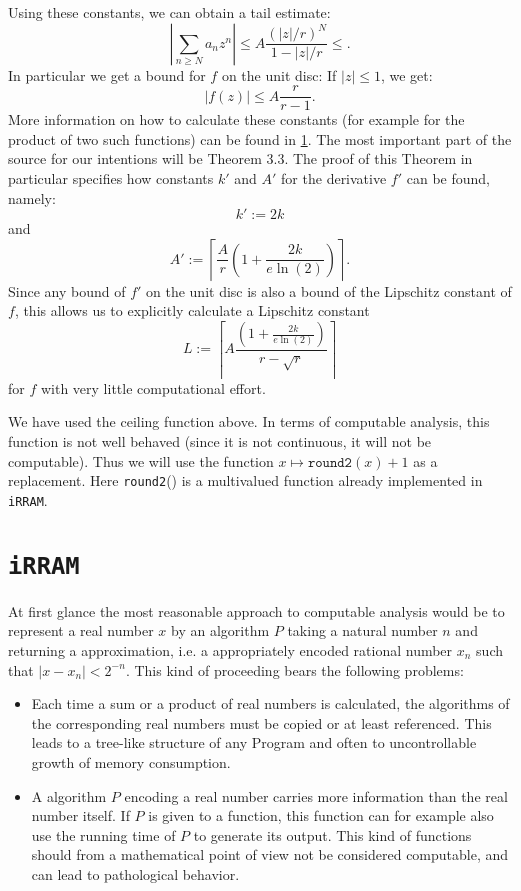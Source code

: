 \documentclass{article}
\newcommand{\irram}{\texttt{iRRAM}\xspace}
\newcommand{\ir}[1]{\texttt{#1}\xspace}
\begin{document}
Using these constants, we can obtain a tail estimate:
\[ \left|\sum_{n \geq N} a_n z^n\right| \leq A \frac{(|z|/r)^N}{1- |z|/r} \leq. \]
In particular we get a bound for $f$ on the unit disc: If $|z|\leq 1$, we get:
\[ |f(z)| \leq A\frac r{r-1}. \]
More information on how to calculate these constants (for example for the product of two such functions) can be found in \ref{}. The most important part of the source for our intentions will be Theorem 3.3. The proof of this Theorem in particular specifies how constants $k'$ and $A'$ for the derivative $f'$ can be found, namely:
\[ k' := 2 k \]
and
\[ A' := \left\lceil \frac{A}{r} \left(1+ \frac{2k}{e \ln(2)}\right)\right\rceil. \]
Since any bound of $f'$ on the unit disc is also a bound of the Lipschitz constant of $f$, this allows us to explicitly calculate a Lipschitz constant
\[ L := \left\lceil A \frac{\left(1 + \frac{2k}{e\ln(2)}\right)}{r-\sqrt{r}}\right\rceil \]
for $f$ with very little computational effort.

We have used the ceiling function above. In terms of computable analysis, this function is not well behaved (since it is not continuous, it will not be computable). Thus we will use the function $x \mapsto \ir{round2}(x) +1$ as a replacement. Here \ir{round2}() is a multivalued function already implemented in \irram.

\section{\irram}

At first glance the most reasonable approach to computable analysis would be to represent a real number $x$ by an algorithm $P$ taking a natural number $n$ and returning a approximation, i.e. a appropriately encoded rational number $x_n$ such that $|x-x_n|<2^{-n}$. This kind of proceeding bears the following problems:
\begin{itemize}
\item Each time a sum or a product of real numbers is calculated, the algorithms of the corresponding real numbers must be copied or at least referenced. This leads to a tree-like structure of any Program and often to uncontrollable growth of memory consumption.
\item A algorithm $P$ encoding a real number carries more information than the real number itself. If $P$ is given to a function, this function can for example also use the running time of $P$ to generate its output. This kind of functions should from a mathematical point of view not be considered computable, and can lead to pathological behavior.
\end{itemize}
\end{document}
